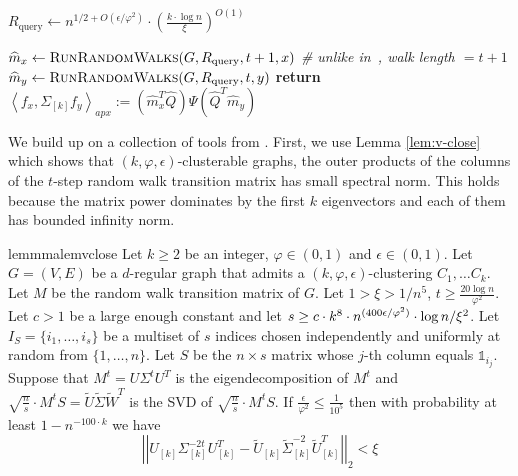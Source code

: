 \documentclass[letterpaper,11pt]{article}
\newcommand{\Q}{\widehat{Q}}
\newcommand{\m}{\widehat{m}}
\theoremstyle{plain}
\theoremstyle{definition}
\theoremstyle{remark}
\newcommand{\adp}[1]
  {\ensuremath{\left\langle #1 \right\rangle_{\scriptscriptstyle apx}}}
\newcommand{\return}{\textbf{return }}
\newcommand{\mycolor}[1]{\textcolor{black}{#1}}
\begin{document}
\begin{algorithm}[H]
	\caption{$\textsc{WeightedDotProductOracle}(G,x,y,  \xi, \mathcal{D})$  \textit{\qquad \qquad  \# $\mathcal{D}_w:=\{\Psi,\Q\}$}
}
\label{alg:weighted-dot}
\begin{algorithmic}[1]
	\STATE $R_{\text{query}}\gets n^{1/2 + O(\epsilon / \varphi^2)} \cdot  \left(\frac{k\cdot \log n}{\xi}\right)^{O(1)}$
				
		\STATE ${\m_x\gets \textsc{RunRandomWalks}(G,R_{\text{query}},t+1,x)}$
		 \textit{\quad \# unlike in~\cite{GluchKLMS21},  walk length  $=t+1$}
		\STATE ${\m_y\gets \textsc{RunRandomWalks}(G,R_{\text{query}},t,y)}$ 
	\STATE  \return $\adp{f_{x},\Sigma_{[k]} f_y}:=(\m_x^T \Q) \Psi (\Q^T\m_y)$  
\end{algorithmic}
\end{algorithm}

We build up on a collection of tools from \cite{GluchKLMS21}. First, we use Lemma \ref{lem:v-close} 
which shows that $(k,\varphi,\epsilon)$-clusterable graphs, the outer products of the columns of 
the $t$-step random walk transition matrix has small spectral norm. This holds because 
the matrix power dominates by the first $k$ eigenvectors and each of them has bounded infinity norm.


\begin{restatable}{lemmma}{lemvclose}\label{lem:v-close}
Let $k \geq 2$ be an integer, $\varphi \in (0,1)$ and $\epsilon\in (0,1)$. Let $G=(V,E)$ be a $d$-regular 
graph that admits a $(k,\varphi,\epsilon)$-clustering $C_1, \ldots C_k$. 
Let $M$ be the random walk transition matrix of $G$. Let $1> \xi>1/n^5$,
$t\geq \frac{20 \log n}{\varphi^2}$. Let $c>1$ be a large enough constant and let $s\ge  c\cdot \mycolor{k^8} \cdot n^{(400 \epsilon / \varphi^2)}\cdot \log n /\xi^2$.  Let $I_S=\{i_1,\ldots, i_s\}$ be a multiset of $s$ indices chosen independently and uniformly at random from
$\{1,\dots,n\}$. Let $S$ be the $n\times s$ matrix whose $j$-th column equals $\mathds{1}_{i_j}$. Suppose that $M^t=U\Sigma^tU^T$ is the eigendecomposition of $M^t$ and $\sqrt{\frac{n}{s}} \cdot M^tS=\widetilde{U}\widetilde{\Sigma}\widetilde{W}^T$ is  the SVD of $\sqrt{\frac{n}{s}} \cdot M^tS$. 
If $\frac{\epsilon}{\varphi^2}\leq \frac{1}{10^5}$ then with probability at least $1-n^{-100\cdot k}$ we have
$$
\left|\left|U_{[k]} {\Sigma}_{[k]}^{-2t} U_{[k]}^T - \widetilde{U}_{[k]} \widetilde{\Sigma}_{[k]}^{-2} \widetilde{U}_{[k]}^T \right|\right|_2 < \xi
$$
\end{restatable}
\end{document}
